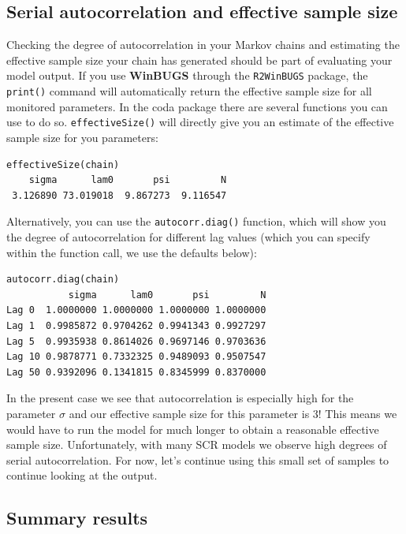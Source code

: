 \subsection{Serial autocorrelation and effective sample size}

Checking the degree of autocorrelation in your Markov chains and 
estimating the effective sample size your chain has generated should 
be part of evaluating your model output. If you use {\bf WinBUGS}
 through the \mbox{\tt R2WinBUGS} package, the \verb#print()# command 
 will automatically return the effective sample size for all monitored 
 parameters. In the coda package there are several functions you can use 
 to do so. \verb#effectiveSize()# will directly give you an estimate 
 of the effective sample size for you parameters:
\begin{verbatim}
effectiveSize(chain)
    sigma      lam0       psi         N 
 3.126890 73.019018  9.867273  9.116547 
\end{verbatim}

Alternatively, you can use the \verb#autocorr.diag()# function, which will show you the degree of autocorrelation for different lag values (which you can specify within the function call, we use the defaults below):
\begin{verbatim}
autocorr.diag(chain)
           sigma      lam0       psi         N
Lag 0  1.0000000 1.0000000 1.0000000 1.0000000
Lag 1  0.9985872 0.9704262 0.9941343 0.9927297
Lag 5  0.9935938 0.8614026 0.9697146 0.9703636
Lag 10 0.9878771 0.7332325 0.9489093 0.9507547
Lag 50 0.9392096 0.1341815 0.8345999 0.8370000
\end{verbatim}
In the present case we see that autocorrelation is especially high for the 
parameter $\sigma$ and our effective sample size for this parameter is 
3! 
This means we would have to run the model for much longer to 
obtain a reasonable effective sample size. Unfortunately, with many SCR models we observe high degrees of serial autocorrelation. For now, let's continue using this small set of samples to continue looking at the output.


\subsection{Summary results}
\label{mcmc.sec.mcmcsummary}

